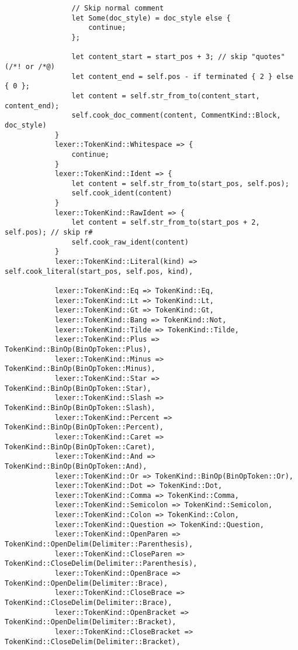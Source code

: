 {\begin{itemize}
\begin{lstlisting}
                // Skip normal comment
                let Some(doc_style) = doc_style else {
                    continue;
                };

                let content_start = start_pos + 3; // skip "quotes" (/*! or /*@)
                let content_end = self.pos - if terminated { 2 } else { 0 };
                let content = self.str_from_to(content_start, content_end);
                self.cook_doc_comment(content, CommentKind::Block, doc_style)
            }
            lexer::TokenKind::Whitespace => {
                continue;
            }
            lexer::TokenKind::Ident => {
                let content = self.str_from_to(start_pos, self.pos);
                self.cook_ident(content)
            }
            lexer::TokenKind::RawIdent => {
                let content = self.str_from_to(start_pos + 2, self.pos); // skip r#
                self.cook_raw_ident(content)
            }
            lexer::TokenKind::Literal(kind) => self.cook_literal(start_pos, self.pos, kind),

            lexer::TokenKind::Eq => TokenKind::Eq,
            lexer::TokenKind::Lt => TokenKind::Lt,
            lexer::TokenKind::Gt => TokenKind::Gt,
            lexer::TokenKind::Bang => TokenKind::Not,
            lexer::TokenKind::Tilde => TokenKind::Tilde,
            lexer::TokenKind::Plus => TokenKind::BinOp(BinOpToken::Plus),
            lexer::TokenKind::Minus => TokenKind::BinOp(BinOpToken::Minus),
            lexer::TokenKind::Star => TokenKind::BinOp(BinOpToken::Star),
            lexer::TokenKind::Slash => TokenKind::BinOp(BinOpToken::Slash),
            lexer::TokenKind::Percent => TokenKind::BinOp(BinOpToken::Percent),
            lexer::TokenKind::Caret => TokenKind::BinOp(BinOpToken::Caret),
            lexer::TokenKind::And => TokenKind::BinOp(BinOpToken::And),
            lexer::TokenKind::Or => TokenKind::BinOp(BinOpToken::Or),
            lexer::TokenKind::Dot => TokenKind::Dot,
            lexer::TokenKind::Comma => TokenKind::Comma,
            lexer::TokenKind::Semicolon => TokenKind::Semicolon,
            lexer::TokenKind::Colon => TokenKind::Colon,
            lexer::TokenKind::Question => TokenKind::Question,
            lexer::TokenKind::OpenParen => TokenKind::OpenDelim(Delimiter::Parenthesis),
            lexer::TokenKind::CloseParen => TokenKind::CloseDelim(Delimiter::Parenthesis),
            lexer::TokenKind::OpenBrace => TokenKind::OpenDelim(Delimiter::Brace),
            lexer::TokenKind::CloseBrace => TokenKind::CloseDelim(Delimiter::Brace),
            lexer::TokenKind::OpenBracket => TokenKind::OpenDelim(Delimiter::Bracket),
            lexer::TokenKind::CloseBracket => TokenKind::CloseDelim(Delimiter::Bracket),


\end{lstlisting}
\end{itemize}}
